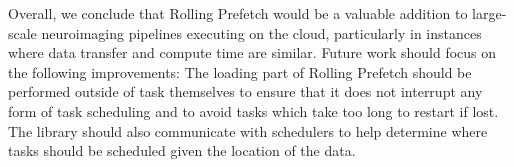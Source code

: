 
Overall, we conclude that Rolling Prefetch would be a valuable addition to
large-scale neuroimaging pipelines executing on the cloud, particularly in
instances where data transfer and compute time are similar. 
Future work should focus on the following improvements: The loading part of
Rolling Prefetch should be performed outside of task themselves to ensure that
it does not interrupt any form of task scheduling and to avoid tasks which take
too long to restart if lost. The library should also communicate with schedulers
to help determine where tasks should be scheduled given the location of the
data.
